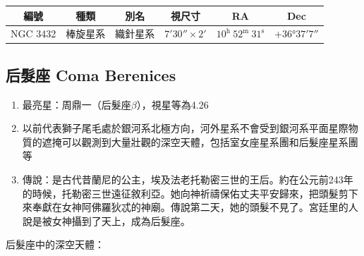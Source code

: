 \begin{center}
\begin{longtable}{c | c | c | c | c | c}
    編號 & 種類 & 別名 & 視尺寸 & RA & Dec \\
    \hline
    \endfirsthead


    \endfoot

    \endlastfoot

    NGC 3432 & 棒旋星系 & 織針星系 & \(\ang{;7;30}\times\ang{;2;}\) & \(10^\text{h }52^\text{m }31^\text{s}\) & \(+\ang{36;37;7}\) \\
\end{longtable}
\end{center}

\subsection{后髮座 Coma Berenices}
\begin{enumerate}
    \item 最亮星：周鼎一（后髮座\(\beta\)），視星等為4.26
    \item 以前代表獅子尾毛處於銀河系北極方向，河外星系不會受到銀河系平面星際物質的遮掩可以觀測到大量壯觀的深空天體，包括室女座星系團和后髮座星系團等
    \item 傳說：是古代昔蘭尼的公主，埃及法老托勒密三世的王后。約在公元前243年的時候，托勒密三世遠征敘利亞。她向神祈禱保佑丈夫平安歸來，把頭髮剪下來奉獻在女神阿佛羅狄忒的神廟。傳說第二天，她的頭髮不見了。宮廷里的人說是被女神攝到了天上，成為后髮座。
\end{enumerate}
后髮座中的深空天體：

